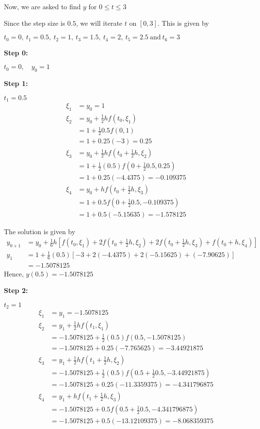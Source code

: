 \documentclass[12pt,a4paper]{article}
\begin{document}
Now, we are asked to find $y$ for $0\leq t \leq 3$

Since the step size is $0.5$, we will iterate $t$ on $\left[ 0,3 \right] $. This is given by 

$t_0 = 0, \: t_1 =0.5,\: t_2 = 1,\: t_3 = 1.5,\: t_4 = 2,\: t_5 = 2.5 \: \text{and} \: t_6 = 3$

\hspace{2pt}

\noindent
\textbf{Step 0:}

$t_0 = 0, \quad y_0 = 1 $

\noindent
\textbf{Step 1:}

$ t_1 = 0.5 $
\begin{align*}
\xi_1 &= y_0 = 1\\
\xi_2 &= y_0 + \frac{1}{2}hf(t_0,\xi_1) \\
&= 1 + \frac{1}{2}0.5f(0,1)\\
&= 1 + 0.25(-3) = 0.25 \\
\xi_3 &= y_0 + \frac{1}{2}hf\left( t_0 + \frac{1}{2}h, \xi_2 \right)  \\
&= 1 + \frac{1}{2}(0.5)f\left( 0 + \frac{1}{2}0.5, 0.25 \right)  \\
&= 1 + 0.25(-4.4375) = -0.109375  \\
\xi_4 &= y_0 + hf\left( t_0 + \frac{1}{2}h, \xi_3\right) \\
&= 1 + 0.5f\left( 0 + \frac{1}{2}0.5, -0.109375\right) \\
&= 1 + 0.5(-5.15635) = -1.578125
\end{align*}

The solution is given by 
\begin{align*}
y_{0+1} &= y_0 + \frac{1}{6}h\left[ f(t_0 , \xi_1 ) + 2f(t_0 + \frac{1}{2} h , \xi_2) + 2f(t_0 + \frac{1}{2} h , \xi_3 ) + f(t_0 + h , \xi_4) \right] \\
y_1 &= 1 + \frac{1}{6}(0.5)\left[ -3 + 2(-4.4375) + 2( -5.15625 ) + (-7.90625) \right] \\
&= -1.5078125
\end{align*}
Hence, \quad $y(0.5) = -1.5078125$

\textbf{Step 2:}

$ t_2 = 1 $
\begin{align*}
\xi_1 &= y_1 = -1.5078125 \\
\xi_2 &= y_1 + \frac{1}{2}hf(t_1,\xi_1) \\
&= -1.5078125 + \frac{1}{2}(0.5)f(0.5,-1.5078125)\\
&= -1.5078125 + 0.25(-7.765625) = -3.44921875 \\
\xi_3 &= y_1 + \frac{1}{2}hf\left( t_1 + \frac{1}{2}h, \xi_2 \right)  \\
&= -1.5078125 + \frac{1}{2}(0.5)f\left( 0.5 + \frac{1}{2}0.5, -3.44921875 \right)  \\
&= -1.5078125 + 0.25(-11.3359375) = -4.341796875  \\
\xi_4 &= y_1 + hf\left( t_1 + \frac{1}{2}h, \xi_3\right) \\
&= -1.5078125 + 0.5f\left( 0.5 + \frac{1}{2}0.5, -4.341796875\right) \\
&= -1.5078125 + 0.5(-13.12109375) = -8.068359375
\end{align*}
\end{document}

